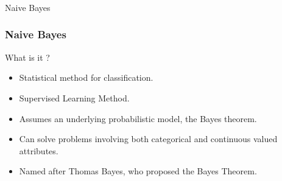 \begin{frame}[fragile]\frametitle{}
\begin{center}
{\Large Naive Bayes}
\end{center}
\end{frame}

\begin{frame}[fragile]\frametitle{Naive Bayes}
 What is it ?
\begin{itemize}
\item Statistical method for classification.
\item Supervised Learning Method.
\item Assumes an underlying probabilistic model, the Bayes theorem.
\item  Can solve problems involving both categorical and continuous valued attributes.
\item  Named after Thomas Bayes, who proposed the Bayes Theorem.
\end{itemize}
\end{frame}


%
%

%

